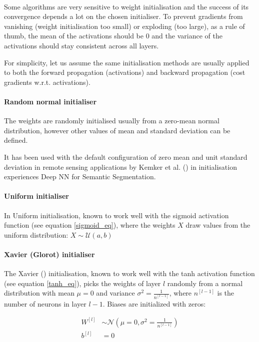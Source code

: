 \paragraph{}
Some algorithms are very sensitive to weight initialisation and the success of its convergence depends a lot on the chosen initialiser. To prevent gradients from vanishing (weight initialisation too small) or exploding (too large), as a rule of thumb, the mean of the activations should be $0$ and the variance of the activations should stay consistent across all layers.

For simplicity, let us assume the same initialisation methods are usually applied to both the forward propagation (activations) and backward propagation (cost gradients \gls{w.r.t.} activations).

\paragraph{Random normal initialiser} The weights are randomly initialised usually from a zero-mean normal distribution, however other values of mean and standard deviation can be defined. 

It has been used with the default configuration of zero mean and unit standard deviation in remote sensing applications by Kemker et al. (\cite{kemker2018algorithms}) in initialisation experiences Deep \gls{NN} for Semantic Segmentation.

\paragraph{Uniform initialiser} In Uniform initialisation, known to work well with the sigmoid activation function (see equation \ref{sigmoid_eq}), where the weights $X$ draw values from the uniform distribution:
$X \sim \mathcal{U}(a,b)$
\paragraph{Xavier (Glorot) initialiser} The Xavier (\cite{pmlrv9glorot10a}) initialisation, known to work well with the tanh activation function (see equation \ref{tanh_eq}), picks the weights of layer $l$ randomly from a normal distribution with mean $\mu = 0$ and variance $\sigma^2 = \frac{1}{n^{[l-1]}}$, where $n^{[l-1]}$ is the number of neurons in layer $l-1$. Biases are initialized with zeros:

\begin{equation} 
\begin{aligned}W^{[l]} &\sim \mathcal{N}(\mu=0,\sigma^2 = \frac{1}{n^{[l-1]}})\\ b^{[l]} &= 0\end{aligned}
\end{equation}

